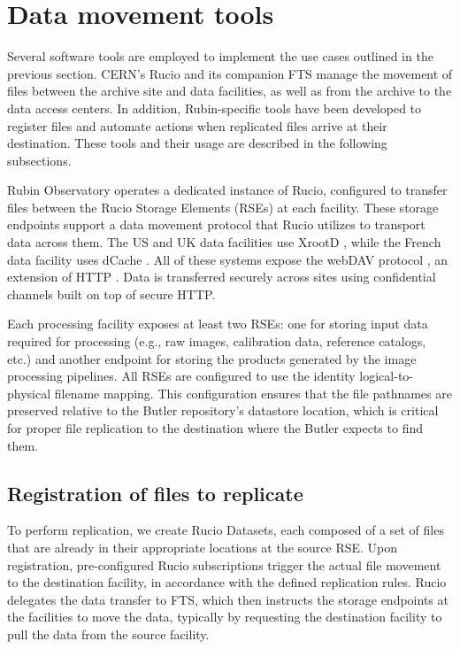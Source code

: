 \documentclass{webofc}
\begin{document}
\section{Data movement tools}
\label{section-data-movement-tools}

Several software tools are employed to implement the use cases outlined in the previous section. CERN's Rucio \cite{rucio2019} and its companion FTS \cite{FTS} manage the movement of files between the archive site and data facilities, as well as from the archive to the data access centers. In addition, Rubin-specific tools have been developed to register files and automate actions when replicated files arrive at their destination. These tools and their usage are described in the following subsections.

Rubin Observatory operates a dedicated instance of Rucio, configured to transfer files between the Rucio Storage Elements (RSEs) at each facility. These storage endpoints support a data movement protocol that Rucio utilizes to transport data across them. The US and UK data facilities use XrootD \cite{xrootd}, while the French data facility uses dCache \cite{dCache}. All of these systems expose the webDAV protocol \cite{webdav}, an extension of HTTP \cite{http1.1}. Data is transferred securely across sites using confidential channels built on top of secure HTTP.

Each processing facility exposes at least two RSEs: one for storing input data required for processing (e.g., raw images, calibration data, reference catalogs, etc.) and another endpoint for storing the products generated by the image processing pipelines. All RSEs are configured to use the identity logical-to-physical filename mapping. This configuration ensures that the file pathnames are preserved relative to the Butler repository's datastore location, which is critical for proper file replication to the destination where the Butler expects to find them.

\subsection{Registration of files to replicate}
\label{registration}

To perform replication, we create Rucio Datasets, each composed of a set of files that are already in their appropriate locations at the source RSE. Upon registration, pre-configured Rucio subscriptions trigger the actual file movement to the destination facility, in accordance with the defined replication rules. Rucio delegates the data transfer to FTS, which then instructs the storage endpoints at the facilities to move the data, typically by requesting the destination facility to pull the data from the source facility.
\end{document}
